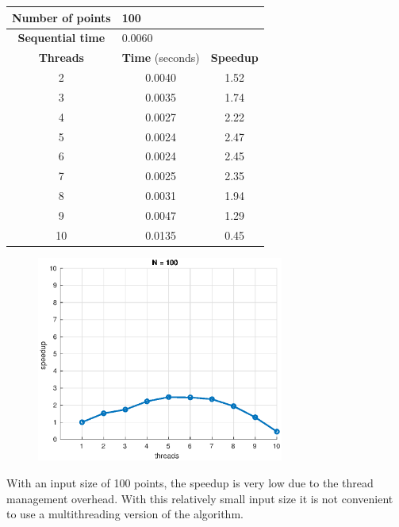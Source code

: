 \documentclass[10pt,twocolumn,letterpaper]{article}
\begin{document}
\begin{table}[H]
\begin{tabular}{c c c}
\hline
\textbf{Number of points} & \multicolumn{2}{l}{100} \\
\hline
\textbf{Sequential time} & \multicolumn{2}{l}{0.0060} \\
\hline
\textbf{Threads} & \textbf{Time} (seconds) & \textbf{Speedup} \\
\hline
2 & 0.0040 & 1.52 \\
3 & 0.0035 & 1.74 \\
4 & 0.0027 & 2.22 \\
5 & 0.0024 & 2.47 \\
6 & 0.0024 & 2.45 \\
7 & 0.0025 & 2.35 \\
8 & 0.0031 & 1.94 \\
9 & 0.0047 & 1.29 \\
10 & 0.0135 & 0.45 \\
\end{tabular}
\end{table}

\begin{figure}[H]
\centering
\includegraphics[width=3.2in]{fig/speedup100.eps}
\end{figure}

With an input size of 100 points, the speedup is very low due to the thread management overhead. With this relatively small input size it is not convenient to use a multithreading version of the algorithm.
\end{document}
